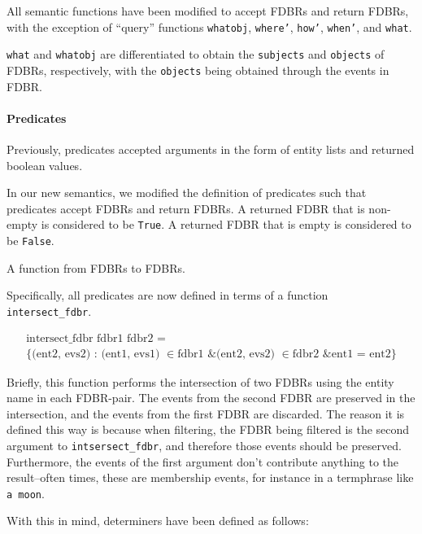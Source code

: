 \documentclass[../main.tex]{subfiles}
\begin{document}
All semantic functions have been modified to accept FDBRs and return FDBRs, with the exception of ``query'' functions
\texttt{whatobj}, \texttt{where'}, \texttt{how'}, \texttt{when'}, and \texttt{what}.

\texttt{what} and \texttt{whatobj} are differentiated to obtain the \texttt{subjects} and \texttt{objects} of FDBRs, respectively, with the
\texttt{objects} being obtained through the events in FDBR. 

\paragraph{Predicates}
Previously, predicates accepted arguments in the form of entity lists and returned boolean values.

In our new semantics, we modified the definition of predicates such that predicates accept FDBRs and return FDBRs.  A returned FDBR that is non-empty is 
considered to be \texttt{True}.  A returned FDBR that is empty is considered to be \texttt{False}.

\begin{definition}[Predicate]
	A function from FDBRs to FDBRs.
\end{definition}

Specifically, all predicates are now defined in terms of a function \texttt{intersect\_fdbr}.

\begin{definition}
	\begin{multline}
	\text{intersect\_fdbr fdbr1 fdbr2 = } \\ \{\text{(ent2, evs2) : (ent1, evs1) }\in \text{fdbr1 \& (ent2, evs2) } \in \text{fdbr2 \& ent1 = ent2}\}
	\end{multline}
\end{definition}

Briefly, this function performs the intersection of two FDBRs using the entity name in each FDBR-pair.  The events from the second FDBR are preserved
in the intersection, and the events from the first FDBR are discarded.  The reason it is defined this way is because when filtering, the FDBR being filtered
is the second argument to \texttt{intsersect\_fdbr}, and therefore those events should be preserved.  Furthermore, the events of the first argument
don't contribute anything to the result--often times, these are membership events, for instance in a termphrase like \texttt{a moon}.

With this in mind, determiners have been defined as follows:
\end{document}
